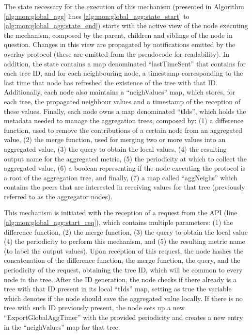 

The state necessary for the execution of this mechanism (presented in Algorithm \ref{alg:mon:global_agg} lines \ref{alg:mon:global_agg:state_start} to \ref{alg:mon:global_agg:state_end}) starts with the active view of the node executing the mechanism, composed by the parent, children and siblings of the node in question. Changes in this view are propagated by notifications emitted by the overlay protocol (these are omitted from the pseudocode for readability). In addition, the state contains a map denominated ``lastTimeSent'' that contains for each tree ID, and for each neighbouring node, a timestamp corresponding to the last time that node has refreshed the existence of the tree with that ID. Additionally, each node also maintains a ``neighValues'' map, which stores, for each tree, the propagated neighbour values and a timestamp of the reception of these values. Finally, each node owns a map denominated ``tIds'',  which holds the metadata needed to manage the aggregation trees, composed by: (1) a difference function, used to remove the contributions of a certain node from an aggregated value, (2) the merge function, used for merging two or more values into an aggregated value, (3) the query to obtain the local values, (4) the resulting output name for the aggregated metric, (5) the periodicity at which to collect the aggregated value, (6) a boolean representing if the node executing the protocol is a root of the aggregation tree, and finally, (7) a map called ``aggNeighs'' which contains the peers that are interested in receiving values for that tree (previously referred to as the aggregator nodes).

This mechanism is initiated with the reception of a request from the API (line \ref{alg:mon:global_agg:start_req}), which contains multiple parameters: (1) the difference function, (2) the merge function, (3) the query to obtain the local value (4) the periodicity to perform this mechanism, and (5) the resulting metric name (to label the output values). Upon reception of this request, the node hashes the concatenation of the difference function, the merge function, the query, and the periodicity of the request, obtaining the tree ID, which will be common to every node in the tree. After the ID generation, the node checks if there already is a tree with that ID present in its local ``tIds'' map, setting as true the variable which denotes if the node should save the aggregated value locally. If there is no tree with such ID previously present, the node sets up a new ``ExportGlobalAggTimer'' with the provided periodicity and creates a new entry in the ``neighValues'' map for that tree.

